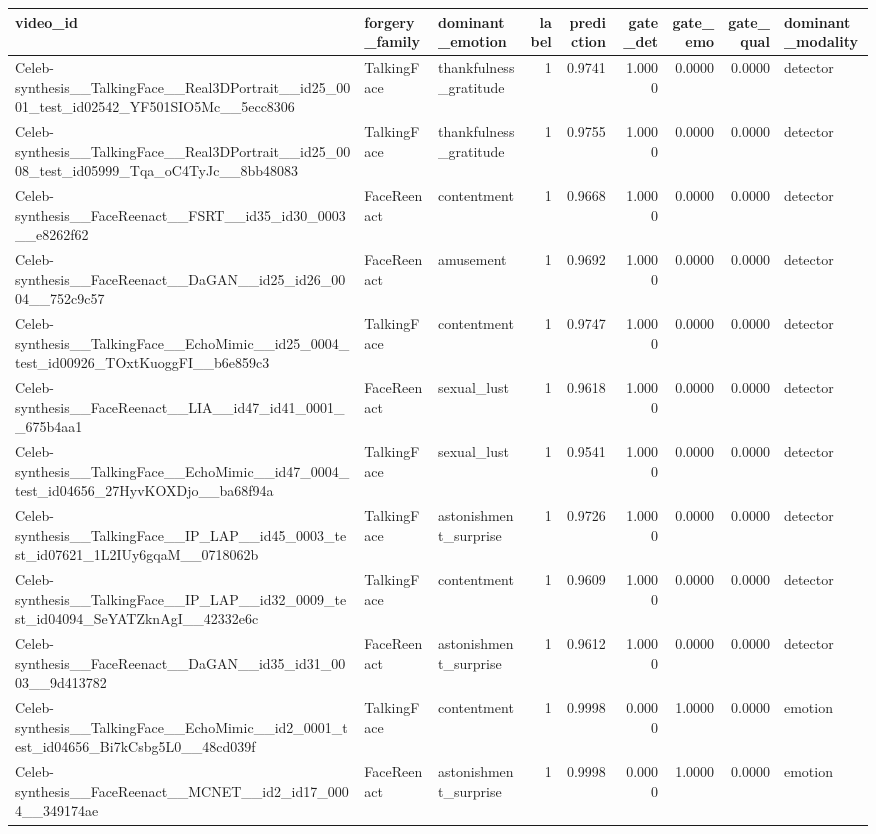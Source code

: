 \begin{tabular}{lllrrrrrl}
\toprule
video_id & forgery_family & dominant_emotion & label & prediction & gate_det & gate_emo & gate_qual & dominant_modality \\
\midrule
Celeb-synthesis__TalkingFace__Real3DPortrait__id25_0001_test_id02542_YF501SIO5Mc__5ecc8306 & TalkingFace & thankfulness_gratitude & 1 & 0.9741 & 1.0000 & 0.0000 & 0.0000 & detector \\
Celeb-synthesis__TalkingFace__Real3DPortrait__id25_0008_test_id05999_Tqa_oC4TyJc__8bb48083 & TalkingFace & thankfulness_gratitude & 1 & 0.9755 & 1.0000 & 0.0000 & 0.0000 & detector \\
Celeb-synthesis__FaceReenact__FSRT__id35_id30_0003__e8262f62 & FaceReenact & contentment & 1 & 0.9668 & 1.0000 & 0.0000 & 0.0000 & detector \\
Celeb-synthesis__FaceReenact__DaGAN__id25_id26_0004__752c9c57 & FaceReenact & amusement & 1 & 0.9692 & 1.0000 & 0.0000 & 0.0000 & detector \\
Celeb-synthesis__TalkingFace__EchoMimic__id25_0004_test_id00926_TOxtKuoggFI__b6e859c3 & TalkingFace & contentment & 1 & 0.9747 & 1.0000 & 0.0000 & 0.0000 & detector \\
Celeb-synthesis__FaceReenact__LIA__id47_id41_0001__675b4aa1 & FaceReenact & sexual_lust & 1 & 0.9618 & 1.0000 & 0.0000 & 0.0000 & detector \\
Celeb-synthesis__TalkingFace__EchoMimic__id47_0004_test_id04656_27HyvKOXDjo__ba68f94a & TalkingFace & sexual_lust & 1 & 0.9541 & 1.0000 & 0.0000 & 0.0000 & detector \\
Celeb-synthesis__TalkingFace__IP_LAP__id45_0003_test_id07621_1L2IUy6gqaM__0718062b & TalkingFace & astonishment_surprise & 1 & 0.9726 & 1.0000 & 0.0000 & 0.0000 & detector \\
Celeb-synthesis__TalkingFace__IP_LAP__id32_0009_test_id04094_SeYATZknAgI__42332e6c & TalkingFace & contentment & 1 & 0.9609 & 1.0000 & 0.0000 & 0.0000 & detector \\
Celeb-synthesis__FaceReenact__DaGAN__id35_id31_0003__9d413782 & FaceReenact & astonishment_surprise & 1 & 0.9612 & 1.0000 & 0.0000 & 0.0000 & detector \\
Celeb-synthesis__TalkingFace__EchoMimic__id2_0001_test_id04656_Bi7kCsbg5L0__48cd039f & TalkingFace & contentment & 1 & 0.9998 & 0.0000 & 1.0000 & 0.0000 & emotion \\
Celeb-synthesis__FaceReenact__MCNET__id2_id17_0004__349174ae & FaceReenact & astonishment_surprise & 1 & 0.9998 & 0.0000 & 1.0000 & 0.0000 & emotion \\

\end{tabular}
